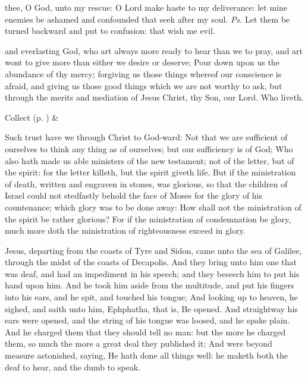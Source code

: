 
\introit
{} thee, O God, unto my rescue: O Lord make haste to my deliverance: let mine enemies be ashamed and confounded that seek after my soul. \textit{Ps.} Let them be turned backward and put to confusion: that wish me evil.

\collect
{} and everlasting God, who art always more ready to hear than we to pray, and art wont to give more than either we desire or deserve; Pour down upon us the abundance of thy mercy; forgiving us those things whereof our conscience is afraid, and giving us those good things which we are not worthy to ask, but through the merits and mediation of Jesus Christ, thy Son, our Lord. Who liveth.
\begin{rubric}
     Collect  (p. \pageref{SPSaints}) \&  
\end{rubric}

 Such trust have we through Christ to God-ward: Not that we are sufficient of ourselves to think any thing as of ourselves; but our sufficiency is of God; Who also hath made us able ministers of the new testament; not of the letter, but of the spirit: for the letter killeth, but the spirit giveth life. But if the ministration of death, written and engraven in stones, was glorious, so that the children of Israel could not stedfastly behold the face of Moses for the glory of his countenance; which glory was to be done away: How shall not the ministration of the spirit be rather glorious? For if the ministration of condemnation be glory, much more doth the ministration of righteousness exceed in glory.


 Jesus, departing from the coasts of Tyre and Sidon, came unto the sea of Galilee, through the midst of the coasts of Decapolis. And they bring unto him one that was deaf, and had an impediment in his speech; and they beseech him to put his hand upon him. And he took him aside from the multitude, and put his fingers into his ears, and he spit, and touched his tongue; And looking up to heaven, he sighed, and saith unto him, Ephphatha, that is, Be opened. And straightway his ears were opened, and the string of his tongue was loosed, and he spake plain. And he charged them that they should tell no man: but the more he charged them, so much the more a great deal they published it; And were beyond measure astonished, saying, He hath done all things well: he maketh both the deaf to hear, and the dumb to speak.

